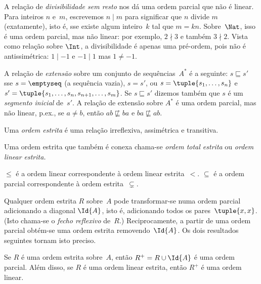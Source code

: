 \documentclass[../../../include/open-logic-section]{subfiles}
\begin{document}
\begin{ex}
A relação de \emph{divisibilidade sem resto} nos dá uma
ordem parcial que não é linear. Para inteiros $n$ e~$m$, escrevemos
$n \mid m$ para significar que $n$ divide $m$ (exatamente), isto é, sse
existe algum inteiro~$k$ tal que $m = kn$. Sobre~$\Nat$, isso é uma ordem parcial,
mas não linear: por exemplo, $2 \nmid 3$ e também $3 \nmid
2$. Vista como relação sobre $\Int$, a divisibilidade é apenas uma
pré-ordem, pois não é antissimétrica: $1 \mid -1$ e $-1 \mid 1$
mas $1 \neq -1$.
\end{ex}

\begin{ex}
A relação de \emph{extensão} sobre um conjunto de sequências~$A^*$ é a
seguinte: $s \sqsubseteq s'$ sse $s = \emptyseq$ (a sequência
vazia), $s = s'$, ou $s = \tuple{s_1, \dots, s_n}$ e $s' =
\tuple{s_1, \dots, s_n, s_{n+1}, \dots, s_m}$. Se $s \sqsubseteq s'$
dizemos também que $s$ é um \emph{segmento inicial} de~$s'$. A
relação de extensão sobre $A^*$ é uma ordem parcial, mas não linear,
p.ex., se $a \neq b$, então $ab \not\sqsubseteq ba$ e $ba \not\sqsubseteq ab$.
\end{ex}

\begin{defn}
Uma \emph{ordem estrita} é uma relação irreflexiva, assimétrica
e transitiva.
\end{defn}

\begin{defn}
Uma ordem estrita que também é conexa chama-se
\emph{ordem total estrita} ou \emph{ordem linear estrita.}
\end{defn}

\begin{ex}
$\le$ é a ordem linear correspondente à ordem linear estrita~$<$.
$\subseteq$ é a ordem parcial correspondente à ordem estrita~$\subsetneq$.
\end{ex}

Qualquer ordem estrita $R$ sobre~$A$ pode transformar-se numa ordem parcial
adicionando a diagonal $\Id{A}$, isto é, adicionando todos os pares~$\tuple{x,
x}$. (Isto chama-se o \emph{fecho reflexivo} de~$R$.)
Reciprocamente, a partir de uma ordem parcial obtém-se uma ordem estrita
removendo~$\Id{A}$. Os dois resultados seguintes tornam isto preciso.

\begin{prop}
Se $R$ é uma ordem estrita sobre~$A$, então $R^+ = R \cup \Id{A}$ é uma
ordem parcial. Além disso, se $R$ é uma ordem linear estrita, então $R^+$ é
uma ordem linear.
\end{prop}
\end{document}
